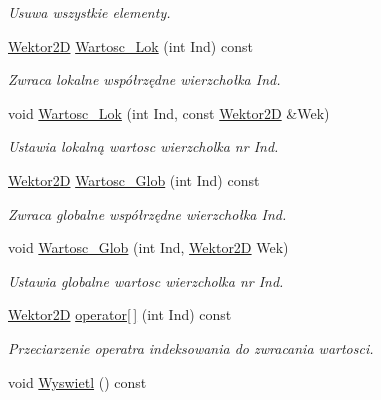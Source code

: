 \begin{DoxyCompactItemize}
\begin{DoxyCompactList}\small\item\em Usuwa wszystkie elementy. \end{DoxyCompactList}\item 
\hypertarget{class_objekt___graficzny_ad893e3051506b480a1338c2c234859d3}{\hyperlink{class_wektor2_d}{Wektor2\+D} \hyperlink{class_objekt___graficzny_ad893e3051506b480a1338c2c234859d3}{Wartosc\+\_\+\+Lok} (int Ind) const }\label{class_objekt___graficzny_ad893e3051506b480a1338c2c234859d3}

\begin{DoxyCompactList}\small\item\em Zwraca lokalne współrzędne wierzchołka Ind. \end{DoxyCompactList}\item 
void \hyperlink{class_objekt___graficzny_aca0acf1d25d7db81c40e9762a7f85072}{Wartosc\+\_\+\+Lok} (int Ind, const \hyperlink{class_wektor2_d}{Wektor2\+D} \&Wek)
\begin{DoxyCompactList}\small\item\em Ustawia lokalną wartosc wierzcholka nr Ind. \end{DoxyCompactList}\item 
\hypertarget{class_objekt___graficzny_a9872ecb81143f6f5a7e2296b354c0bcc}{\hyperlink{class_wektor2_d}{Wektor2\+D} \hyperlink{class_objekt___graficzny_a9872ecb81143f6f5a7e2296b354c0bcc}{Wartosc\+\_\+\+Glob} (int Ind) const }\label{class_objekt___graficzny_a9872ecb81143f6f5a7e2296b354c0bcc}

\begin{DoxyCompactList}\small\item\em Zwraca globalne współrzędne wierzchołka Ind. \end{DoxyCompactList}\item 
void \hyperlink{class_objekt___graficzny_afbe393725fafac38ac1dbf42486c1467}{Wartosc\+\_\+\+Glob} (int Ind, \hyperlink{class_wektor2_d}{Wektor2\+D} Wek)
\begin{DoxyCompactList}\small\item\em Ustawia globalne wartosc wierzcholka nr Ind. \end{DoxyCompactList}\item 
\hyperlink{class_wektor2_d}{Wektor2\+D} \hyperlink{class_objekt___graficzny_a14be7409a5989797c6197536d8f577d5}{operator\mbox{[}$\,$\mbox{]}} (int Ind) const 
\begin{DoxyCompactList}\small\item\em Przeciarzenie operatra indeksowania do zwracania wartosci. \end{DoxyCompactList}\item 
\hypertarget{class_objekt___graficzny_ae3e239a8ea20f6849d13c1eaf4a29b28}{void \hyperlink{class_objekt___graficzny_ae3e239a8ea20f6849d13c1eaf4a29b28}{Wyswietl} () const }\label{class_objekt___graficzny_ae3e239a8ea20f6849d13c1eaf4a29b28}


\end{DoxyCompactItemize}
